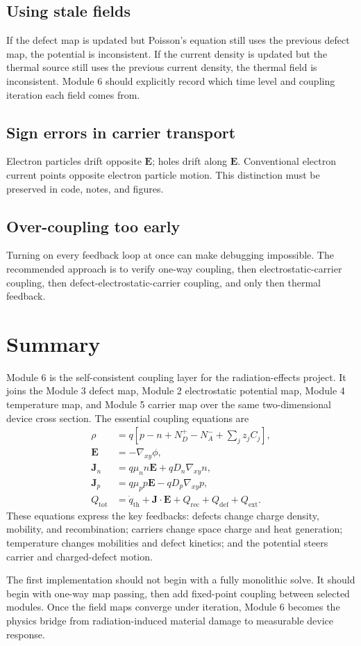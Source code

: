 \documentclass[11pt]{article}
\newcommand{\Evec}{\bm{E}}
\newcommand{\Jvec}{\bm{J}}
\newcommand{\gradxy}{\nabla_{xy}}
\begin{document}
\subsection{Using stale fields}

If the defect map is updated but Poisson's equation still uses the previous defect map, the potential is inconsistent. If the current density is updated but the thermal source still uses the previous current density, the thermal field is inconsistent. Module 6 should explicitly record which time level and coupling iteration each field comes from.

\subsection{Sign errors in carrier transport}

Electron particles drift opposite \(\Evec\); holes drift along \(\Evec\). Conventional electron current points opposite electron particle motion. This distinction must be preserved in code, notes, and figures.

\subsection{Over-coupling too early}

Turning on every feedback loop at once can make debugging impossible. The recommended approach is to verify one-way coupling, then electrostatic-carrier coupling, then defect-electrostatic-carrier coupling, and only then thermal feedback.

\section{Summary}

Module 6 is the self-consistent coupling layer for the radiation-effects project. It joins the Module 3 defect map, Module 2 electrostatic potential map, Module 4 temperature map, and Module 5 carrier map over the same two-dimensional device cross section. The essential coupling equations are
\begin{align}
\rho &= q\left[p-n+N_D^+-N_A^-+\sum_j z_j C_j\right], \\
\Evec &= -\gradxy\phi, \\
\Jvec_n &= q\mu_n n\Evec + qD_n\gradxy n, \\
\Jvec_p &= q\mu_p p\Evec - qD_p\gradxy p, \\
Q_{\mathrm{tot}} &= \dot{q}_{\mathrm{th}}+\Jvec\cdot\Evec+Q_{\mathrm{rec}}+Q_{\mathrm{def}}+Q_{\mathrm{ext}}.
\end{align}
These equations express the key feedbacks: defects change charge density, mobility, and recombination; carriers change space charge and heat generation; temperature changes mobilities and defect kinetics; and the potential steers carrier and charged-defect motion.

The first implementation should not begin with a fully monolithic solve. It should begin with one-way map passing, then add fixed-point coupling between selected modules. Once the field maps converge under iteration, Module 6 becomes the physics bridge from radiation-induced material damage to measurable device response.
\end{document}
